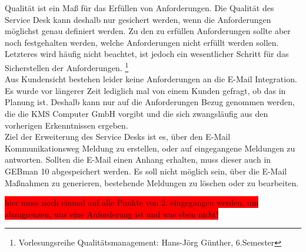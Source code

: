 \noindent
Qualität ist ein Maß für das Erfüllen von Anforderungen. Die Qualität des Service Desk kann deshalb nur gesichert werden, wenn die Anforderungen möglichst genau definiert werden. Zu den zu erfüllen Anforderungen sollte aber noch festgehalten werden, welche Anforderungen nicht erfüllt werden sollen. Letzteres wird häufig nicht beachtet, ist jedoch ein wesentlicher Schritt für das Sicherstellen der Anforderungen. \footnote{Vorlesungsreihe Qualitätsmanagement: Hans-Jörg Günther, 6.Semester}\\

\noindent
Aus Kundensicht bestehen leider keine Anforderungen an die E-Mail Integration. Es wurde vor längerer Zeit lediglich mal von einem Kunden gefragt, ob das in Planung ist. Deshalb kann nur auf die Anforderungen Bezug genommen werden, die die KMS Computer GmbH vorgibt und die sich zwangsläufig aus den vorherigen Erkenntnissen ergeben.\\

\noindent
Ziel der Erweiterung des Service Desks ist es, über den E-Mail Kommunikationsweg Meldung zu erstellen, oder auf eingegangene Meldungen zu antworten. Sollten die E-Mail einen Anhang erhalten, muss dieser auch in GEBman 10 abgespeichert werden.\newline
Es soll nicht möglich sein, über die E-Mail Maßnahmen zu generieren, bestehende Meldungen zu löschen oder zu bearbeiten. 


\colorbox{red}{hier muss noch einmal auf alle Punkte von 2. eingegangen werden, um abzugrenzen, was eine Anforderung ist und was eben nicht! }
